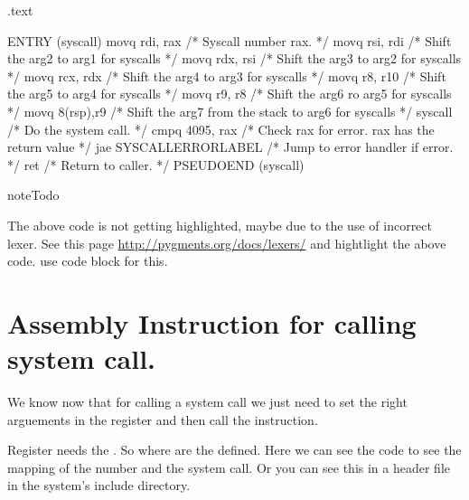 \documentclass[letterpaper,10pt,english]{sphinxmanual}
\begin{document}
\begin{sphinxVerbatim}[commandchars=\\\{\}]
.text

    ENTRY (syscall)
        movq \PYGZpc{}rdi, \PYGZpc{}rax             /* Syscall number \PYGZhy{}\PYGZgt{} rax.  */
        movq \PYGZpc{}rsi, \PYGZpc{}rdi             /* Shift the arg2 to arg1 for syscalls */
        movq \PYGZpc{}rdx, \PYGZpc{}rsi             /* Shift the arg3 to arg2 for syscalls */
        movq \PYGZpc{}rcx, \PYGZpc{}rdx             /* Shift the arg4 to arg3 for syscalls */
        movq \PYGZpc{}r8, \PYGZpc{}r10              /* Shift the arg5 to arg4 for syscalls */
        movq \PYGZpc{}r9, \PYGZpc{}r8               /* Shift the arg6 ro arg5 for syscalls */
        movq 8(\PYGZpc{}rsp),\PYGZpc{}r9            /* Shift the arg7 from the stack to arg6 for syscalls */
        syscall                     /* Do the system call.  */
        cmpq \PYGZdl{}\PYGZhy{}4095, \PYGZpc{}rax           /* Check \PYGZpc{}rax for error. \PYGZpc{}rax has the return value  */
        jae SYSCALL\PYGZus{}ERROR\PYGZus{}LABEL     /* Jump to error handler if error.  */
        ret                         /* Return to caller.  */
    PSEUDO\PYGZus{}END (syscall)
\end{sphinxVerbatim}

\begin{sphinxadmonition}{note}{Todo}

The above code is not getting highlighted, maybe due to the use of
incorrect lexer. See this page \url{http://pygments.org/docs/lexers/} and
hightlight the above code. use code block for this.
\end{sphinxadmonition}


\section{Assembly Instruction for calling system call.}
\label{\detokenize{07_calling_system_calls:assembly-instruction-for-calling-system-call}}
We know now that for calling a system call we just need to set the right
arguements in the register and then call the  instruction.

Register  needs the . So where are the  defined. Here we can see the  code to see the mapping
of the number and the system call. Or you can see this in a header file in the
system's include directory.
\end{document}
